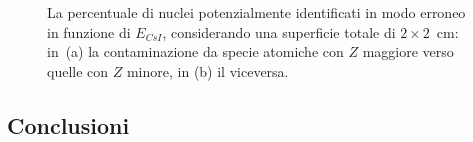 \begin{figure}[!p] 
	\centering
	\hspace{10mm}
	\caption{La percentuale di nuclei potenzialmente identificati in modo erroneo in funzione di $E_{CsI}$, considerando una superficie totale di $2 \times 2$~cm: in~(a) la contaminazione da specie atomiche con $Z$ maggiore verso quelle con $Z$ minore, in (b) il viceversa.} \label{fig:leakage_res_2}
\end{figure}









\subsection*{Conclusioni}





